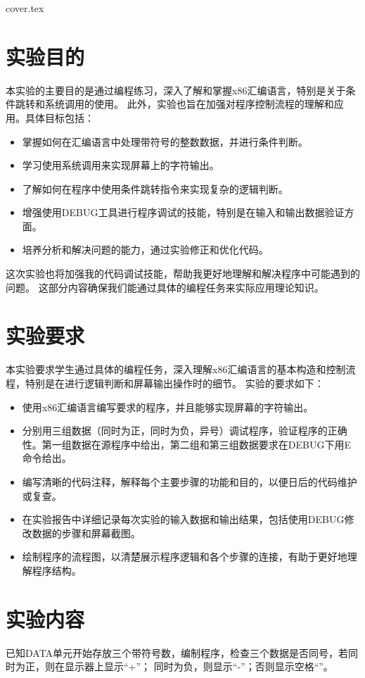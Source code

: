 \documentclass[12pt]{article}
\begin{document}
 {cover.tex}
\section{实验目的}
本实验的主要目的是通过编程练习，深入了解和掌握x86汇编语言，特别是关于条件跳转和系统调用的使用。
此外，实验也旨在加强对程序控制流程的理解和应用。具体目标包括：
\begin{itemize}
    \item 掌握如何在汇编语言中处理带符号的整数数据，并进行条件判断。
    \item 学习使用系统调用来实现屏幕上的字符输出。
    \item 了解如何在程序中使用条件跳转指令来实现复杂的逻辑判断。
    \item 增强使用DEBUG工具进行程序调试的技能，特别是在输入和输出数据验证方面。
    \item 培养分析和解决问题的能力，通过实验修正和优化代码。
\end{itemize}

这次实验也将加强我的代码调试技能，帮助我更好地理解和解决程序中可能遇到的问题。
这部分内容确保我们能通过具体的编程任务来实际应用理论知识。
\section{实验要求}
本实验要求学生通过具体的编程任务，深入理解x86汇编语言的基本构造和控制流程，特别是在进行逻辑判断和屏幕输出操作时的细节。
实验的要求如下：
\begin{itemize}
    \item 使用x86汇编语言编写要求的程序，并且能够实现屏幕的字符输出。
    \item 分别用三组数据（同时为正，同时为负，异号）调试程序，验证程序的正确性。第一组数据在源程序中给出，第二组和第三组数据要求在DEBUG下用E命令给出。
    \item 编写清晰的代码注释，解释每个主要步骤的功能和目的，以便日后的代码维护或复查。
    \item 在实验报告中详细记录每次实验的输入数据和输出结果，包括使用DEBUG修改数据的步骤和屏幕截图。
    \item 绘制程序的流程图，以清楚展示程序逻辑和各个步骤的连接，有助于更好地理解程序结构。
\end{itemize}

\section{实验内容}
已知DATA单元开始存放三个带符号数，编制程序，检查三个数据是否同号，若同时为正，则在显示器上显示“+”；
同时为负，则显示“-”；否则显示空格“\;”。
\end{document}
